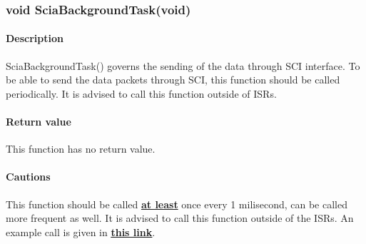 \documentclass{article}
\begin{document}
\subsubsection{void SciaBackgroundTask(void)}
\label{subsubsection:sciabackgroundtask}
\begin{addmargin}[4em]{1em}
	\paragraph{Description}
	SciaBackgroundTask() governs the sending of the data through SCI interface. To be able to send the data packets through SCI, this function should be called periodically. It is advised to call this function outside of ISRs. 
	\paragraph{Return value}
	This function has no return value.
	\paragraph{Cautions}
	This function should be called  \textbf{\underline{at least}} once every 1 milisecond, can be called more frequent as well. It is advised to call this function outside of the ISRs. An example call is given in \href{https://github.com/hakansrc/fault_tolerant_drives/blob/master/Software/MultipleDataPlot/ExampleProject/main.c}{\underline{\textbf{this link}}}.
\end{addmargin}
\end{document}
